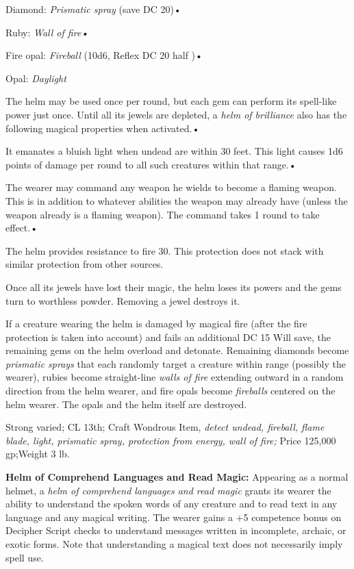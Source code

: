 Diamond: \textit{Prismatic spray }(save DC 20)•

Ruby: \textit{Wall of fire•}

Fire opal: \textit{Fireball }(10d6, Reflex DC 20 half )•

Opal: \textit{Daylight}

The helm may be used once per round, but each gem can perform its spell-like power 
just once. Until all its jewels are depleted, a \textit{helm of brilliance }also 
has the following magical properties when activated.•

It emanates a bluish light when undead are within 30 feet. This light causes 1d6 
points of damage per round to all such creatures within that range.•

The wearer may command any weapon he wields to become a flaming weapon. This is 
in addition to whatever abilities the weapon may already have (unless the weapon 
already is a flaming weapon). The command takes 1 round to take effect.•

The helm provides resistance to fire 30. This protection does not stack with similar 
protection from other sources.

Once all its jewels have lost their magic, the helm loses its powers and the gems 
turn to worthless powder. Removing a jewel destroys it.

If a creature wearing the helm is damaged by magical fire (after the fire protection 
is taken into account) and fails an additional DC 15 Will save, the remaining gems 
on the helm overload and detonate. Remaining diamonds become \textit{prismatic 
sprays }that each randomly target a creature within range (possibly the wearer), 
rubies become straight-line \textit{walls of fire }extending outward in a random 
direction from the helm wearer, and fire opals become \textit{fireballs }centered 
on the helm wearer. The opals and the helm itself are destroyed.

Strong varied; CL 13th; Craft Wondrous Item, \textit{detect undead, fireball, flame 
blade, light, prismatic spray, protection from energy, wall of fire; }Price 125,000 
gp;Weight 3 lb.

\textbf{Helm of Comprehend Languages and Read Magic:} Appearing as a normal helmet, 
a \textit{helm of comprehend languages and read magic }grants its wearer the ability 
to understand the spoken words of any creature and to read text in any language 
and any magical writing. The wearer gains a +5 competence bonus on Decipher Script 
checks to understand messages written in incomplete, archaic, or exotic forms. 
Note that understanding a magical text does not necessarily imply spell use.


